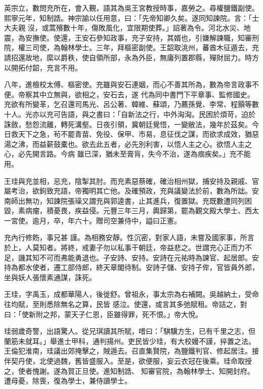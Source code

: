 \begin{pinyinscope}
 英宗立，數問充所在，會入覲，語其為吳王宮教授時事，嘉勞之。尋權鹽鐵副使。熙寧元年，知制誥。神宗諭以任用意，曰：「先帝知卿久矣。遂同知諫院。言：「士大夫親
 沒，或蒿殯數十年，傷敗風化，宜限期使葬。」詔著為令。河北水災、地震，為安撫使。使還，王安石參知政事，充子安持，其婿也，引嫌解諫職，知審刑院，權三司使，為翰林學士。三年，拜樞密副使。王韶取洮州，蕃酋木征遁去，充請招還故地，縻以爵秩，使自領所部，永為外臣，無庸列置郡縣，殫財屈力。時方以開拓付韶，充言不用。



 八年，進檢校太傅、樞密使。充雖與安石連姻，而心不善其所為，數為帝言政事不便。帝察其中立無與，欲相之，安石去，遂
 代為同中書門下平章事、監修國史。充欲有所變革，乞召還司馬光、呂公著、韓維、蘇頌，乃薦孫覺、李常、程顥等數十人。光亦以充可告語，與之書曰：「自新法之行，中外洶洶。民困於煩苛，迫於誅斂，愁怨流離，轉死溝壑。日夜引領，冀朝廷覺悟，一變敝法，幾年於茲矣。今日救天下之急，茍不罷青苗、免役、保甲、市易，息征伐之謀，而欲求成效，猶惡湯之沸，而益薪鼓橐也。欲去此五者，必先別利害，以悟人主之心。欲悟人主之心，必先開言路。今病
 雖已深，猶未至膏肓，失今不治，遂為痼疾矣。」充不能用。



 王珪與充並相，忌充，陰掣其肘。而充素惡蔡確，確治相州獄，捕安持及親戚、官屬考治，欲鉤致充語，帝獨明其亡他。及確預政，充與議變法於前，數為所詘。安南師出無功，知諫院張璪又謂充與郭逵書，止其進兵，復置獄。充既數遭同列困毀，素病瘤，積憂畏，疾益侵。元豐三年三月，輿歸第，罷為觀文殿大學士、西太一宮使。逾月，卒，年六十。贈司空兼侍中，謚曰正憲。



 充內行修飭，事兄甚
 謹。為相務安靜。性沉密，對家人語，未嘗及國家事，所言於上，人莫知者。將終，戒妻子勿以私事干朝廷，帝益悲之。世謂充心正而力不足，譏其知不可而弗能勇退也。子安詩、安持。安詩在元祐時為諫官、起居郎。安持為都水使者，遷工部侍郎，終天章閣待制。安詩子儲、安持子侔，官皆員外郎，坐與妖人張懷素通謀，誅死。



 王珪，字禹玉，成都華陽人，後徙舒。曾祖永，事太宗為右補闕。吳越納土，受命往均賦，至則悉除無名之算，民皆
 感泣。使還，或言其多弛賦租。帝詰之，對曰：「使新附之邦，蒙天子仁恩，臣雖得罪，死不恨。」帝大悅。



 珪弱歲奇警，出語驚人。從兄琪讀其所賦，唶曰：「騏驥方生，已有千里之志，但蘭筋未就耳。」舉進士甲科，通判揚州。吏民皆少珪，有大校嫚不謹，捽置之法。王倫犯淮南，珪議出郊掩擊之，賊遁去。召直集賢院，為鹽鐵判官、修起居注。接伴契丹使，北使過魏，舊皆盛服入。至是，欲便服，妄云衣冠在後乘。珪命取授之，使者愧謝。遂為賀正旦使。進知制誥、
 知審官院，為翰林學士、知開封府。遭母憂，除喪，復為學士，兼侍讀學士。




\end{pinyinscope}
